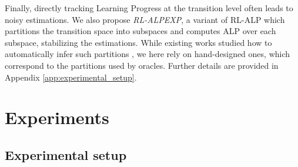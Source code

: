 \documentclass{article}
\begin{document}
Finally, directly tracking Learning Progress at the transition level often leads to noisy estimations. We also propose \textit{RL-ALPEXP}, a variant of RL-ALP which partitions the transition space into subspaces and computes ALP over each subspace, stabilizing the estimations. While existing works studied how to automatically infer such partitions \citep{baranes_active_2013}, we here rely on hand-designed ones, which correspond to the partitions used by oracles. Further details are provided in Appendix \ref{app:experimental_setup}.

\section{Experiments}
\subsection{Experimental setup}
\end{document}
